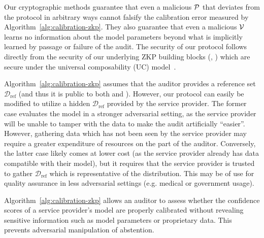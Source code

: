 Our cryptographic methods guarantee that even a malicious $\mathcal{P}$ that deviates from the protocol in arbitrary ways cannot falsify the calibration error measured by Algorithm~\ref{alg:calibration-zkp}. They also guarantee that even a malicious $\mathcal{V}$ learns no information about the model parameters beyond what is implicitly learned by passage or failure of the audit. The security of our protocol follows directly from the security of our underlying ZKP building blocks (\cite{weng2021wolverine}, \cite{franzese2021zkram}) which are secure under the universal composability (UC) model~\cite{canetti2001UC}. %

 Algorithm~\ref{alg:calibration-zkp} assumes that the auditor provides a reference set $\mathcal{D}_{\text{ref}}$ (and thus it is public to both \prover and \verifier). However, our protocol can easily be modified to utilize a hidden $\mathcal{D}_{\text{ref}}$ provided by the service provider. The former case evaluates the model in a stronger adversarial setting, as the service provider will be unable to tamper with the data to make the audit artificially ``easier''. However, gathering data which has not been seen by the service provider may require a greater expenditure of resources on the part of the auditor. Conversely, the latter case likely comes at lower cost (as the service provider already has data compatible with their model), but it requires that the service provider is trusted to gather $\mathcal{D}_{\text{ref}}$ which is representative of the distribution. This may be of use for quality assurance in less adversarial settings (e.g. medical or government usage).%

Algorithm~\ref{alg:calibration-zkp} allows an auditor to assess whether the confidence scores of a service provider's model are properly calibrated without revealing sensitive information such as model parameters or proprietary data. This prevents adversarial manipulation of abstention.

